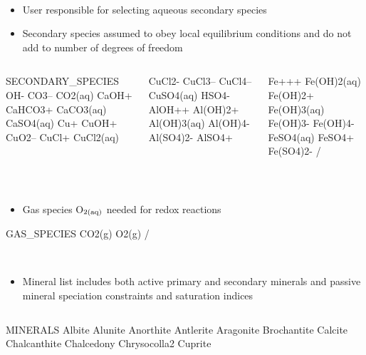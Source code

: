 \documentclass{beamer}
\begin{document}
\begin{frame}
\newpage
~
\begin{itemize}
\item User responsible for selecting aqueous secondary species
\item Secondary species assumed to obey local equilibrium conditions
and do not add to number of degrees of freedom
\end{itemize}
\vspace{-5mm}
  \begin{columns}[c]
\begin{semiverbatim}
  SECONDARY_SPECIES
    OH-
    CO3--
    CO2(aq)
    CaOH+
    CaHCO3+
    CaCO3(aq)
    CaSO4(aq)
    Cu+
    CuOH+
    CuO2--
    CuCl+
    CuCl2(aq)
\end{semiverbatim}
\begin{semiverbatim}
    CuCl2-
    CuCl3--
    CuCl4--
    CuSO4(aq)
    HSO4-
    AlOH++
    Al(OH)2+
    Al(OH)3(aq)
    Al(OH)4-
    Al(SO4)2-
    AlSO4+
\end{semiverbatim}
\begin{semiverbatim}
    Fe+++
    Fe(OH)2(aq)
    Fe(OH)2+
    Fe(OH)3(aq)
    Fe(OH)3-
    Fe(OH)4-
    FeSO4(aq)
    FeSO4+
    Fe(SO4)2-
  /
\end{semiverbatim}
  \end{columns}

  \newpage
  ~
  \begin{itemize}
  \item Gas species O$_{\rm 2(aq)}$ needed for redox reactions
  \end{itemize}
\begin{semiverbatim}

  GAS_SPECIES
    CO2(g)
    O2(g)
  /
\end{semiverbatim}

  \newpage
  ~
  \begin{itemize}
  \item Mineral list includes both active primary and secondary minerals and passive mineral speciation constraints and saturation indices
  \end{itemize}
  \vspace{-3mm}
  \begin{columns}[c]
\begin{semiverbatim}
  MINERALS
    Albite
    Alunite
    Anorthite
    Antlerite
    Aragonite
    Brochantite
    Calcite
    Chalcanthite
    Chalcedony
    Chrysocolla2
    Cuprite


\end{semiverbatim}
\end{columns}
\end{frame}
\end{document}

